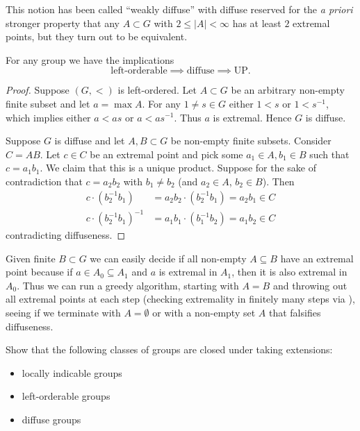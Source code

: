 \begin{remark}
    This notion has been called ``weakly diffuse'' with diffuse reserved for the \emph{a priori} stronger property that any $A \subset G$ with $2 \leq |A| < \infty$ has at least $2$ extremal points, but they turn out to be equivalent.
\end{remark}

\begin{proposition}
    \label{proposition:LO_diffuse_UP}
    For any group we have the implications \[
        \text{left-orderable} \implies \text{diffuse} \implies \text{UP}.
    \]
\end{proposition}

\begin{proof}
    Suppose $(G, <)$ is left-ordered.
    Let $A \subset G$ be an arbitrary non-empty finite subset and let $a = \max A$.
    For any $1 \neq s \in G$ either $1 < s$ or $1 < s^{-1}$, which implies either $a < a s$ or $a < a s^{-1}$.
    Thus $a$ is extremal.
    Hence $G$ is diffuse.

    Suppose $G$ is diffuse and let $A, B \subset G$ be non-empty finite subsets.
    Consider $C = AB$.
    Let $c \in C$ be an extremal point and pick some $a_1 \in A, b_1 \in B$ such that $c = a_1 b_1$.
    We claim that this is a unique product.
    Suppose for the sake of contradiction that $c = a_2 b_2$ with $b_1 \neq b_2$ (and $a_2 \in A$, $b_2 \in B$).
    Then
    \begin{align*}
        c \cdot (b_2^{-1} b_1) &= a_2 b_2 \cdot (b_2^{-1} b_1) = a_2 b_1 \in C \\
        c \cdot (b_2^{-1} b_1)^{-1} &= a_1 b_1 \cdot (b_1^{-1} b_2) = a_1 b_2 \in C
    \end{align*}
    contradicting diffuseness.
\end{proof}

\begin{remark}
    Given finite $B \subset G$ we can easily decide if all non-empty $A \subseteq B$ have an extremal point because if $a \in A_0 \subseteq A_1$ and $a$ is extremal in $A_1$, then it is also extremal in $A_0$.
    Thus we can run a greedy algorithm, starting with $A = B$ and throwing out all extremal points at each step (checking extremality in finitely many steps via ), seeing if we terminate with $A = \emptyset$ or with a non-empty set $A$ that falsifies diffuseness.
\end{remark}

\begin{exercise}
    Show that the following classes of groups are closed under taking extensions:
    \begin{itemize}
        \item locally indicable groups
        \item left-orderable groups
        \item diffuse groups
    \end{itemize}
\end{exercise}


